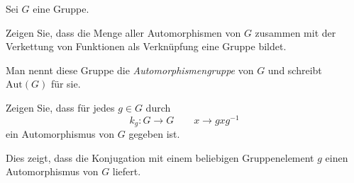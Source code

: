 \begin{Problem}\label{pr:introalgblatt7-1}
	Sei $G$ eine Gruppe.
	\begin{parts}
		\item Zeigen Sie, dass die Menge aller Automorphismen von $G$ zusammen mit der Verkettung von Funktionen als Verknüpfung eine Gruppe bildet. 
		
			Man nennt diese Gruppe die \emph{Automorphismengruppe} von $G$ und schreibt $\text{Aut}(G)$ f\"{u}r sie.
		\item Zeigen Sie, dass f\"{u}r jedes $g\in G$ durch
			\[
				k_g:G\to G\qquad x\to gxg^{-1}
			\]
			ein Automorphismus von $G$ gegeben ist.

Dies zeigt, dass die Konjugation mit einem beliebigen Gruppenelement $g$ einen Automorphismus von $G$ liefert. 
	\end{parts}
\end{Problem}
